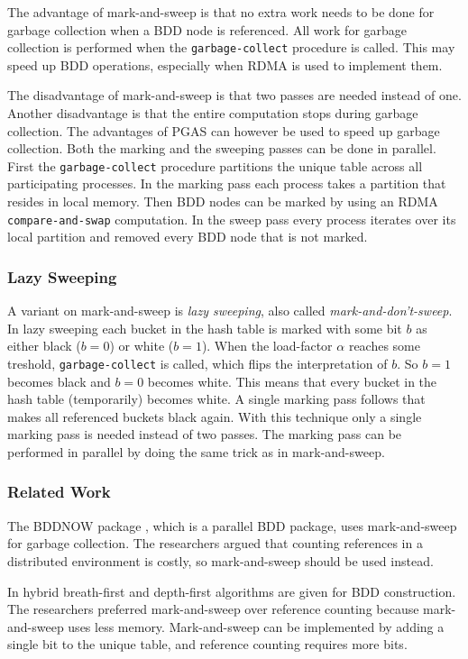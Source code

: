 The advantage of mark-and-sweep is that no extra work needs to be done for garbage collection when a BDD node is referenced. All work for garbage collection is performed when the \texttt{garbage-collect} procedure is called. This may speed up BDD operations, especially when RDMA is used to implement them. 

The disadvantage of mark-and-sweep is that two passes are needed instead of one. Another disadvantage is that the entire computation stops during garbage collection. The advantages of PGAS can however be used to speed up garbage collection. Both the marking and the sweeping passes can be done in parallel. First the \texttt{garbage-collect} procedure partitions the unique table across all participating processes. In the marking pass each process takes a partition that resides in local memory. Then BDD nodes can be marked by using an RDMA \texttt{compare-and-swap} computation. In the sweep pass every process iterates over its local partition and removed every BDD node that is not marked.

\subsubsection{Lazy Sweeping}
A variant on mark-and-sweep is \emph{lazy sweeping}, also called \emph{mark-and-don't-sweep}. In lazy sweeping each bucket in the hash table is marked with some bit $b$ as either black ($b=0$) or white ($b=1$). When the load-factor $\alpha$ reaches some treshold, \texttt{garbage-collect} is called, which flips the interpretation of $b$. So $b=1$ becomes black and $b=0$ becomes white. This means that every bucket in the hash table (temporarily) becomes white. A single marking pass follows that makes all referenced buckets black again. With this technique only a single marking pass is needed instead of two passes. The marking pass can be performed in parallel by doing the same trick as in mark-and-sweep.

\subsubsection{Related Work}
The BDDNOW package \cite{bddnow}, which is a parallel BDD package, uses mark-and-sweep for garbage collection. The researchers argued that counting references in a distributed environment is costly, so mark-and-sweep should be used instead.

In \cite{chen1997breadth} hybrid breath-first and depth-first algorithms are given for BDD construction. The researchers preferred mark-and-sweep over reference counting because mark-and-sweep uses less memory. Mark-and-sweep can be implemented by adding a single bit to the unique table, and reference counting requires more bits. 

